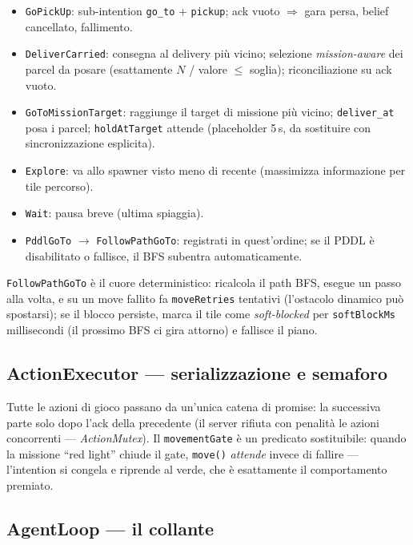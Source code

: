 \documentclass[11pt,a4paper]{article}
\newcommand{\code}[1]{\texttt{#1}}
\begin{document}
\begin{itemize}
  \item \code{GoPickUp}: sub-intention \code{go\_to} + \code{pickup};
    ack vuoto $\Rightarrow$ gara persa, belief cancellato, fallimento.
  \item \code{DeliverCarried}: consegna al delivery più vicino; selezione
    \emph{mission-aware} dei parcel da posare (esattamente $N$ / valore
    $\le$ soglia); riconciliazione su ack vuoto.
  \item \code{GoToMissionTarget}: raggiunge il target di missione più
    vicino; \code{deliver\_at} posa i parcel; \code{holdAtTarget} attende
    (placeholder 5\,s, da sostituire con sincronizzazione esplicita).
  \item \code{Explore}: va allo spawner visto meno di recente (massimizza
    informazione per tile percorso).
  \item \code{Wait}: pausa breve (ultima spiaggia).
  \item \code{PddlGoTo} $\rightarrow$ \code{FollowPathGoTo}: registrati in
    quest'ordine; se il PDDL è disabilitato o fallisce, il BFS subentra
    automaticamente.
\end{itemize}

\code{FollowPathGoTo} è il cuore deterministico: ricalcola il path BFS,
esegue un passo alla volta, e su un move fallito fa \code{moveRetries}
tentativi (l'ostacolo dinamico può spostarsi); se il blocco persiste,
marca il tile come \emph{soft-blocked} per \code{softBlockMs} millisecondi
(il prossimo BFS ci gira attorno) e fallisce il piano.

\subsection{ActionExecutor — serializzazione e semaforo}

Tutte le azioni di gioco passano da un'unica catena di promise: la
successiva parte solo dopo l'ack della precedente (il server rifiuta con
penalità le azioni concorrenti — \emph{ActionMutex}). Il
\code{movementGate} è un predicato sostituibile: quando la missione
``red light'' chiude il gate, \code{move()} \emph{attende} invece di
fallire — l'intention si congela e riprende al verde, che è esattamente il
comportamento premiato.

\subsection{AgentLoop — il collante}
\end{document}
